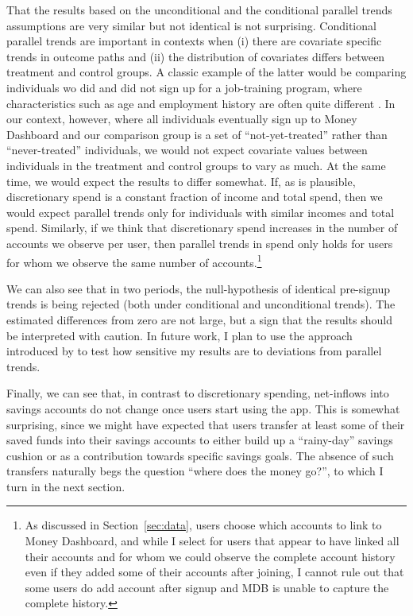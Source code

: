 That the results based on the unconditional and the conditional parallel trends
assumptions are very similar but not identical is not surprising. Conditional
parallel trends are important in contexts when (i) there are covariate specific
trends in outcome paths and (ii) the distribution of covariates differs between
treatment and control groups. A classic example of the latter would be
comparing individuals wo did and did not sign up for a job-training program,
where characteristics such as age and employment history are often quite
different \citep{heckman1997matching}. In our context, however, where all
individuals eventually sign up to Money Dashboard and our comparison group is a
set of ``not-yet-treated'' rather than ``never-treated'' individuals, we would
not expect covariate values between individuals in the treatment and control
groups to vary as much. At the same time, we would expect the results to differ
somewhat. If, as is plausible, discretionary spend is a constant fraction of
income and total spend, then we would expect parallel trends only for
individuals with similar incomes and total spend. Similarly, if we think that
discretionary spend increases in the number of accounts we observe per user,
then parallel trends in spend only holds for users for whom we observe the same
number of accounts.\footnote{As discussed in Section~\ref{sec:data}, users
    choose which accounts to link to Money Dashboard, and while I select for
    users that appear to have linked all their accounts and for whom we could
    observe the complete account history even if they added some of their
accounts after joining, I cannot rule out that some users do add account after
signup and MDB is unable to capture the complete history.}

We can also see that in two periods, the null-hypothesis of identical
pre-signup trends is being rejected (both under conditional and unconditional
trends). The estimated differences from zero are not large, but a sign that the
results should be interpreted with caution. In future work, I plan to use the
approach introduced by \citet{rambachan2022more} to test how sensitive my
results are to deviations from parallel trends.

Finally, we can see that, in contrast to discretionary spending, net-inflows
into savings accounts do not change once users start using the app. This is
somewhat surprising, since we might have expected that users transfer at least
some of their saved funds into their savings accounts to either build up a
``rainy-day'' savings cushion or as a contribution towards specific savings
goals. The absence of such transfers naturally begs the question ``where does
the money go?'', to which I turn in the next section.


